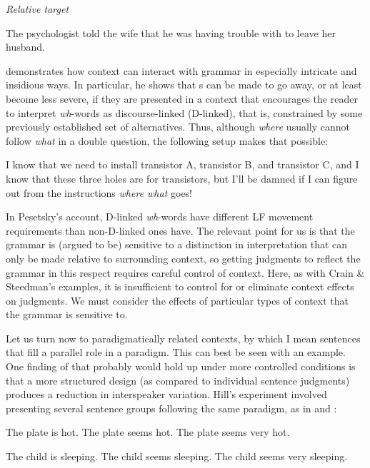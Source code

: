 \ex \textit{Relative target}

The psychologist told the wife that he was having trouble with to leave her husband.
\z
\z


\citet{Pesetsky1987} demonstrates how context can interact with grammar in especially intricate and insidious ways. In particular, he shows that s can be made to go away, or at least become less severe, if they are presented in a context that encourages the reader to interpret \textit{wh}-words as discourse-linked (D-linked), that is, constrained by some previously established set of alternatives. Thus, although \textit{where} usually cannot follow \textit{what} in a double question, the following setup makes that possible:

\ea%
    \label{ex:5:9}  
I know that we need to install transistor A, transistor B, and transistor C, and I know that these three holes are for transistors, but I'll be damned if I can figure out from the instructions \textit{where what} goes!
	 
\z

\noindent
In Pesetsky's account, D-linked \textit{wh}-words have different LF movement requirements than non-D-linked ones have. The relevant point for us is that the grammar is (argued to be) sensitive to a distinction in interpretation that can only be made relative to surrounding  context, so getting judgments to reflect the grammar in this respect requires careful control of context. Here, as with Crain \& Steedman's examples, it is insufficient to control for or eliminate context effects on judgments.
We must consider the effects of particular types of context that the grammar is sensitive to. 


Let us turn now to paradigmatically related contexts, by which I mean sentences that fill a parallel role in a paradigm. This can best be seen with an example. One finding of \citet{Hill1961} that probably would hold up under more controlled conditions is that a more structured design (as compared to individual sentence judgments) produces a reduction in interspeaker variation. Hill's experiment involved presenting several sentence groups following the same paradigm, as in  and :

\ea\label{ex:5:10}
The plate is hot. The plate seems hot. The plate seems very hot.
\z

\ea\label{ex:5:11}
The child is sleeping. The child seems sleeping. The child seems very sleeping.
\z

